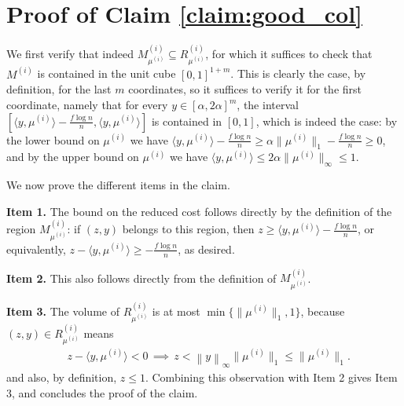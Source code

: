 \documentclass{article}
\renewcommand{\P}{\mathbb{P}}
\newcommand{\ip}{\iprods}
\newcommand{\norm}[1]{\left\lVert#1\right\rVert}
\newcommand{\wv}[0]{\mathbf{w}}
\newcommand{\iprods}[2]{\langle {#1}, {#2} \rangle}
\newcommand{\nrc}{R}
\begin{document}
\section{Proof of Claim \ref{claim:good_col}} \label{app:claimGoodCol}


We first verify that indeed $M_{\mu^{(i)}}^{(i)} \subseteq \nrc_{\mu^{(i)}}^{(i)}$, for which it suffices to check that $M^{(i)}$ is contained in the unit cube $[0,1]^{1+m}$. This is clearly the case, by definition, for the last $m$ coordinates, so it suffices to verify it for the first coordinate, namely that for every $y \in [\alpha, 2\alpha]^m$, the interval $ [\ip{y}{\mu^{(i)}} - \frac{f\log n}{n}, \ip{y}{\mu^{(i)}}]$ is contained in $[0,1]$, which is indeed the case: by the lower bound on $\mu^{(i)}$ we have $\ip{y}{\mu^{(i)}} - \frac{f\log n}{n} \ge \alpha \|\mu^{(i)}\|_1 - \frac{f\log n}{n} \ge 0$, and by the upper bound on $\mu^{(i)}$ we have $\ip{y}{\mu^{(i)}} \le 2 \alpha \|\mu^{(i)}\|_{\infty} \le 1$. 

We now prove the different items in the claim.

\textbf{Item 1.} The bound on the reduced cost follows directly by the definition of the region $M^{(i)}_{\mu^{(i)}}$: if $(z,y)$ belongs to this region, then $z \ge \ip{y}{\mu^{(i)}} - \frac{f\log n}{n}$, or equivalently, $z - \ip{y}{\mu^{(i)}} \ge -\frac{f\log n}{n}$, as desired. 

\textbf{Item 2.} This also follows directly from the definition of $M^{(i)}_{\mu^{(i)}}$.


\textbf{Item 3.} 
The volume of $\nrc_{\mu^{(i)}}^{(i)}$ is at most $\min\{\|\mu^{(i)}\|_1, 1\}$, because $(z,y) \in \nrc_{\mu^{(i)}}^{(i)}$ means 
%
    \begin{align*}
      & z - \ip{y}{\mu^{(i)}} < 0 
      \,\implies\,  z < \norm{y}_\infty \|\mu^{(i)}\|_1 \le \|\mu^{(i)}\|_1.
    \end{align*}
and also, by definition, $z \le 1$. Combining this observation with Item 2 gives Item 3, and concludes the proof of the claim. 





\label{sec:dual_decomp}



\end{document}
